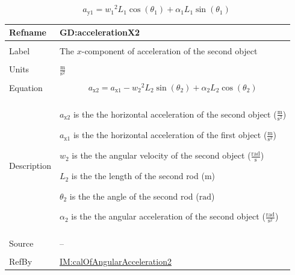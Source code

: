 \documentclass[12pt]{article}
\begin{document}
\begin{displaymath}
{a_{\text{y}1}}={w_{1}}^{2} {L_{1}} \cos\left({θ_{1}}\right)+{α_{1}} {L_{1}} \sin\left({θ_{1}}\right)
\end{displaymath}
\vspace{\baselineskip}
\noindent
\begin{minipage}{\textwidth}
\begin{tabular}{>{\raggedright}p{}>{\raggedright\arraybackslash}p{}}
\toprule \textbf{Refname} & \textbf{GD:accelerationX2}
\label{GD:accelerationX2}
\\ \midrule \\
Label & The $x$-component of acceleration of the second object
        
\\ \midrule \\
Units & $\frac{\text{m}}{\text{s}^{2}}$
        
\\ \midrule \\
Equation & \begin{displaymath}
           {a_{\text{x}2}}={a_{\text{x}1}}-{w_{2}}^{2} {L_{2}} \sin\left({θ_{2}}\right)+{α_{2}} {L_{2}} \cos\left({θ_{2}}\right)
           \end{displaymath}
\\ \midrule \\
Description & \begin{symbDescription}
              \item{${a_{\text{x}2}}$ is the the horizontal acceleration of the second object ($\frac{\text{m}}{\text{s}^{2}}$)}
              \item{${a_{\text{x}1}}$ is the the horizontal acceleration of the first object ($\frac{\text{m}}{\text{s}^{2}}$)}
              \item{${w_{2}}$ is the the angular velocity of the second object ($\frac{\text{rad}}{\text{s}}$)}
              \item{${L_{2}}$ is the the length of the second rod (${\text{m}}$)}
              \item{${θ_{2}}$ is the the angle of the second rod (${\text{rad}}$)}
              \item{${α_{2}}$ is the the angular acceleration of the second object ($\frac{\text{rad}}{\text{s}^{2}}$)}
              \end{symbDescription}
\\ \midrule \\
Source & --
         
\\ \midrule \\
RefBy & \hyperref[IM:calOfAngularAcceleration2]{IM:calOfAngularAcceleration2}
        
\\ \bottomrule
\end{tabular}
\end{minipage}
\end{document}

